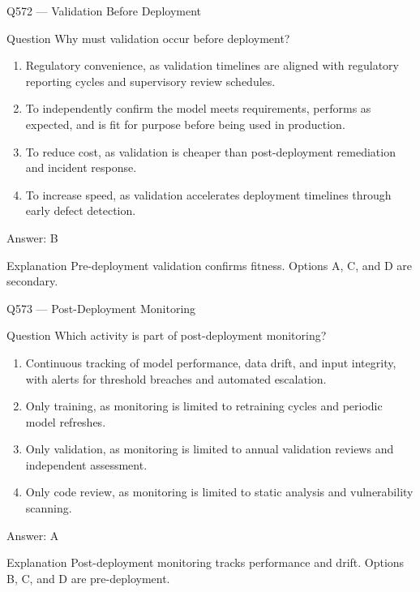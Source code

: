 \documentclass[aspectratio=169,8pt]{beamer}
\begin{document}
	\begin{frame}{Q572 --- Validation Before Deployment}
		\begin{block}{Question}
			Why must validation occur before deployment?
			\begin{enumerate}
				\item Regulatory convenience, as validation timelines are aligned with regulatory reporting cycles and supervisory review schedules.
				\item To independently confirm the model meets requirements, performs as expected, and is fit for purpose before being used in production.
				\item To reduce cost, as validation is cheaper than post-deployment remediation and incident response.
				\item To increase speed, as validation accelerates deployment timelines through early defect detection.
			\end{enumerate}
		\end{block}
		\begin{exampleblock}{Answer: B}\end{exampleblock}
		\begin{block}{Explanation}
			Pre-deployment validation confirms fitness. Options A, C, and D are secondary.
		\end{block}
	\end{frame}
	
	\begin{frame}{Q573 --- Post-Deployment Monitoring}
		\begin{block}{Question}
			Which activity is part of post-deployment monitoring?
			\begin{enumerate}
				\item Continuous tracking of model performance, data drift, and input integrity, with alerts for threshold breaches and automated escalation.
				\item Only training, as monitoring is limited to retraining cycles and periodic model refreshes.
				\item Only validation, as monitoring is limited to annual validation reviews and independent assessment.
				\item Only code review, as monitoring is limited to static analysis and vulnerability scanning.
			\end{enumerate}
		\end{block}
		\begin{exampleblock}{Answer: A}\end{exampleblock}
		\begin{block}{Explanation}
			Post-deployment monitoring tracks performance and drift. Options B, C, and D are pre-deployment.
		\end{block}
	\end{frame}
	
\end{document}
